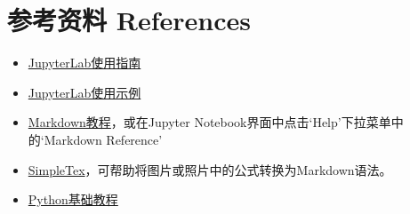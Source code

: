\documentclass{article}
\begin{document}
\section*{参考资料 References}
\label{sec:ref}
\begin{itemize}
  \item \href{https://jupyterlab.readthedocs.io/en/latest/user/}{JupyterLab使用指南}
  \item \href{https://medium.com/@tuenguyends/start-your-first-project-with-jupyter-lab-84f5b78b4522#:~:text=Create%20your%20first%20notebook}{JupyterLab使用示例}
  \item \href{https://markdown.com.cn/}{Markdown教程}，或在Jupyter Notebook界面中点击`Help'下拉菜单中的`Markdown Reference'
  \item \href{https://simpletex.cn/ai/latex_ocr}{SimpleTex}，可帮助将图片或照片中的公式转换为Markdown语法。
  \item \href{https://liaoxuefeng.com/books/python/basic/index.html}{Python基础教程}
\end{itemize}
\end{document}
